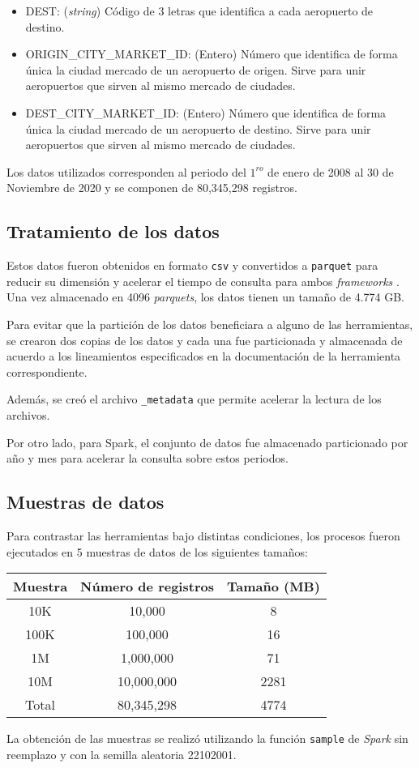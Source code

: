 \begin{itemize}
	\item DEST: (\textit{string}) Código de 3 letras que identifica a cada aeropuerto de destino.
	\item ORIGIN\_CITY\_MARKET\_ID: (Entero) Número que identifica de forma única la ciudad mercado de un aeropuerto de origen. Sirve para unir aeropuertos que sirven al mismo mercado de ciudades.
	\item DEST\_CITY\_MARKET\_ID: (Entero) Número que identifica de forma única la ciudad mercado de un aeropuerto de destino. Sirve para unir aeropuertos que sirven al mismo mercado de ciudades.
\end{itemize}

Los datos utilizados corresponden al periodo del $1^{ro}$ de enero de 2008 al 30 de Noviembre de 2020 y se componen de 80,345,298 registros.

\subsection{Tratamiento de los datos}

Estos datos fueron obtenidos en formato \texttt{csv} y convertidos a \texttt{parquet} para reducir su dimensión y acelerar el tiempo de consulta para ambos \textit{frameworks} . Una vez almacenado en 4096 \textit{parquets}, los datos tienen un tamaño de 4.774 GB.

Para evitar que la partición de los datos beneficiara a alguno de las herramientas, se crearon dos copias de los datos y cada una fue particionada y almacenada de acuerdo a los lineamientos especificados en la documentación de la herramienta correspondiente.

Además, se creó el archivo \texttt{\_metadata} que permite acelerar la lectura de los archivos.

Por otro lado, para Spark, el conjunto de datos fue almacenado particionado por año y mes para acelerar la consulta sobre estos periodos.

\subsection{Muestras de datos}

Para contrastar las herramientas bajo distintas condiciones, los procesos fueron ejecutados en 5 muestras de datos de los siguientes tamaños:\\

\begin{center}
\begin{tabular}{|ccc|}
  \hline
 Muestra & Número de registros & Tamaño (MB) \\ 
  \hline
  10K & 10,000 & 8 \\ 
  100K & 100,000 & 16 \\ 
  1M & 1,000,000 & 71 \\ 
  10M & 10,000,000 & 2281 \\ 
  Total & 80,345,298 & 4774 \\ 
   \hline
\end{tabular}
\end{center}

La obtención de las muestras se realizó utilizando la función \texttt{sample} de \textit{Spark} sin reemplazo y con la semilla aleatoria 22102001.